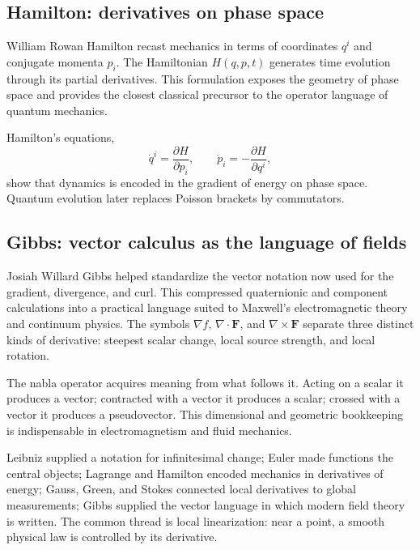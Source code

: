\subsection{Hamilton: derivatives on phase space}
\begin{historicalnote}
William Rowan Hamilton recast mechanics in terms of coordinates $q^i$ and
conjugate momenta $p_i$.  The Hamiltonian $H(q,p,t)$ generates time evolution
through its partial derivatives.  This formulation exposes the geometry of
phase space and provides the closest classical precursor to the operator
language of quantum mechanics.
\end{historicalnote}
\begin{bookinsight}
Hamilton's equations,
\[
\dot q^i=\frac{\partial H}{\partial p_i},\qquad
\dot p_i=-\frac{\partial H}{\partial q^i},
\]
show that dynamics is encoded in the gradient of energy on phase space.
Quantum evolution later replaces Poisson brackets by commutators.
\end{bookinsight}

\subsection{Gibbs: vector calculus as the language of fields}
\begin{historicalnote}
Josiah Willard Gibbs helped standardize the vector notation now used for the
gradient, divergence, and curl.  This compressed quaternionic and component
calculations into a practical language suited to Maxwell's electromagnetic
theory and continuum physics.  The symbols $\nabla f$, $\nabla\!\cdot\mathbf F$,
and $\nabla\!\times\mathbf F$ separate three distinct kinds of derivative:
steepest scalar change, local source strength, and local rotation.
\end{historicalnote}
\begin{bookinsight}
The nabla operator acquires meaning from what follows it.  Acting on a scalar
it produces a vector; contracted with a vector it produces a scalar; crossed
with a vector it produces a pseudovector.  This dimensional and geometric
bookkeeping is indispensable in electromagnetism and fluid mechanics.
\end{bookinsight}

\begin{summarybox}
Leibniz supplied a notation for infinitesimal change; Euler made functions the
central objects; Lagrange and Hamilton encoded mechanics in derivatives of
energy; Gauss, Green, and Stokes connected local derivatives to global
measurements; Gibbs supplied the vector language in which modern field theory
is written.  The common thread is local linearization: near a point, a smooth
physical law is controlled by its derivative.
\end{summarybox}
